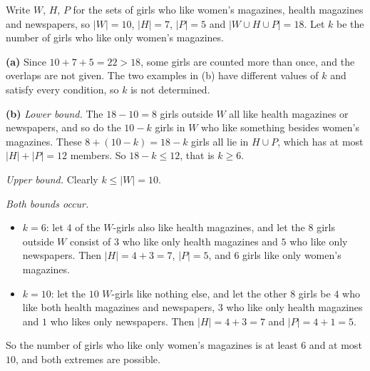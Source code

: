 Write $W$, $H$, $P$ for the sets of girls who like women's magazines, health magazines and newspapers, so $|W|=10$, $|H|=7$, $|P|=5$ and $|W\cup H\cup P|=18$. Let $k$ be the number of girls who like only women's magazines.

\textbf{(a)} Since $10+7+5=22>18$, some girls are counted more than once, and the overlaps are not given. The two examples in (b) have different values of $k$ and satisfy every condition, so $k$ is not determined.

\textbf{(b)} \emph{Lower bound.} The $18-10=8$ girls outside $W$ all like health magazines or newspapers, and so do the $10-k$ girls in $W$ who like something besides women's magazines. These $8+(10-k)=18-k$ girls all lie in $H\cup P$, which has at most $|H|+|P|=12$ members. So $18-k\le12$, that is $k\ge6$.

\emph{Upper bound.} Clearly $k\le|W|=10$.

\emph{Both bounds occur.}
\begin{itemize}
\item $k=6$: let $4$ of the $W$-girls also like health magazines, and let the $8$ girls outside $W$ consist of $3$ who like only health magazines and $5$ who like only newspapers. Then $|H|=4+3=7$, $|P|=5$, and $6$ girls like only women's magazines.
\item $k=10$: let the $10$ $W$-girls like nothing else, and let the other $8$ girls be $4$ who like both health magazines and newspapers, $3$ who like only health magazines and $1$ who likes only newspapers. Then $|H|=4+3=7$ and $|P|=4+1=5$.
\end{itemize}
So the number of girls who like only women's magazines is at least $\boxed{6}$ and at most $\boxed{10}$, and both extremes are possible.
